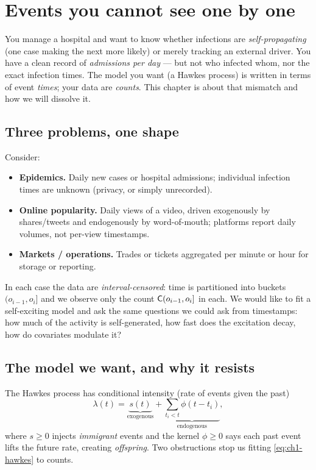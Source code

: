 \chapter{Events you cannot see one by one}
\label{ch:problem}

\begin{motivation}
You manage a hospital and want to know whether infections are
\emph{self-propagating} (one case making the next more likely) or merely tracking
an external driver. You have a clean record of \emph{admissions per day} --- but
not who infected whom, nor the exact infection times. The model you want (a Hawkes
process) is written in terms of event \emph{times}; your data are \emph{counts}.
This chapter is about that mismatch and how we will dissolve it.
\end{motivation}

\section{Three problems, one shape}

Consider:
\begin{itemize}[leftmargin=1.4em]
\item \textbf{Epidemics.} Daily new cases or hospital admissions; individual
infection times are unknown (privacy, or simply unrecorded).
\item \textbf{Online popularity.} Daily views of a video, driven exogenously by
shares/tweets and endogenously by word-of-mouth; platforms report daily volumes,
not per-view timestamps.
\item \textbf{Markets / operations.} Trades or tickets aggregated per minute or
hour for storage or reporting.
\end{itemize}
In each case the data are \emph{interval-censored}: time is partitioned into
buckets $(o_{i-1},o_i]$ and we observe only the count
$\mathsf{C}(o_{i-1},o_i]$ in each. We would like to fit a self-exciting model and
ask the same questions we could ask from timestamps: how much of the activity is
self-generated, how fast does the excitation decay, how do covariates modulate it?

\section{The model we want, and why it resists}

The Hawkes process has conditional intensity (rate of events given the past)
\begin{equation}
\lambda(t)=\underbrace{s(t)}_{\text{exogenous}}+\underbrace{\sum_{t_i<t}\phi(t-t_i)}_{\text{endogenous}},
\label{eq:ch1-hawkes}
\end{equation}
where $s\ge0$ injects \emph{immigrant} events and the kernel $\phi\ge0$ says each
past event lifts the future rate, creating \emph{offspring}. Two obstructions stop
us fitting \eqref{eq:ch1-hawkes} to counts.

